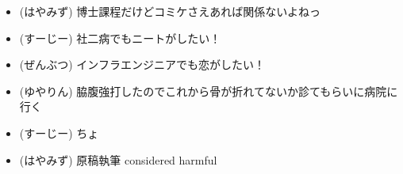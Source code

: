 
%
%

\begin{itemize}
 \item (はやみず) 博士課程だけどコミケさえあれば関係ないよねっ
 \item (すーじー) 社二病でもニートがしたい！
 \item (ぜんぶつ) インフラエンジニアでも恋がしたい！
 \item (ゆやりん) 脇腹強打したのでこれから骨が折れてないか診てもらいに病院に行く
 \item (すーじー) ちょ
 \item (はやみず) 原稿執筆 considered harmful
\end{itemize}
